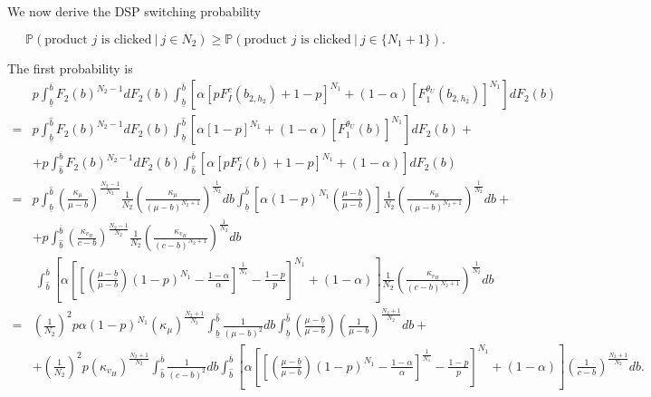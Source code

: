 We now derive the DSP switching probability

\begin{equation*}
     \mathbb{P}(\text{product } j \text{ is clicked} \ | \ j \in N_2 ) \geq \mathbb{P}(\text{product } j \text{ is clicked} \ | \ j \in \{N_{1}+1\} ).
\end{equation*}

\noindent The first probability is
{\footnotesize
\begin{align*}
    & p \int_{\underline{b}}^{\overline{b}}F_2(b)^{N_2-1} dF_2(b) \int_{\underline{b}}^{\overline{b}}  \left[\alpha \left[pF_I^c(b_{2,h_2}) + 1-p \right]^{N_1} + (1-\alpha) \left[F_1^{\theta_U}(b_{2,h_2})\right]^{N_1}\right]  dF_2(b) \\[5pt]
    = & p \int_{\underline{b}}^{\hat{b}}F_2(b)^{N_2-1} dF_2(b) \int_{\underline{b}}^{\hat{b}} \left[\alpha \left[1-p \right]^{N_1} + (1-\alpha) \left[F_1^{\theta_U}(b)\right]^{N_1}\right]  dF_2(b) + \\[5pt]
    & + p \int_{\hat{b}}^{\overline{b}}F_2(b)^{N_2-1} dF_2(b) \int_{\hat{b}}^{\overline{b}} \left[\alpha \left[pF_I^c(b) + 1-p \right]^{N_1} + (1-\alpha) \right]  dF_2(b) \\[5pt]
    = & p \int_{\underline{b}}^{\hat{b}}\left(\frac{\kappa_{\mu}}{\mu-b}\right)^{\frac{N_2-1}{N_2}} \frac{1}{N_2}\left(\frac{\kappa_{\mu}}{(\mu-b)^{N_2+1}}\right)^{\frac{1}{N_2}} db  \int_{\underline{b}}^{\hat{b}} \left[\alpha (1-p)^{N_1}  \left( \frac{\mu-\underline{b}}{\mu - b}\right)\right] \frac{1}{N_2}\left(\frac{\kappa_{\mu}}{(\mu-b)^{N_2+1}}\right)^{\frac{1}{N_2}}  db + \\[5pt]
    & + p \int_{\hat{b}}^{\overline{b}}\left(\frac{\kappa_{v_H}}{c-b}\right)^{\frac{N_2-1}{N_2}} \frac{1}{N_2}\left(\frac{\kappa_{v_H}}{(c-b)^{N_2+1}}\right)^{\frac{1}{N_2}} db \\[5pt]
    & \ \int_{\hat{b}}^{\overline{b}} \left[ \alpha \left[\left[ \left( \frac{\mu-\underline{b}}{\mu - b}\right) (1-p)^{N_1} - \frac{1-\alpha}{\alpha}\right]^{\frac{1}{N_1}} - \frac{1-p}{p} \right]^{N_1} + (1-\alpha) \right] \frac{1}{N_2}\left(\frac{\kappa_{v_H}}{(c-b)^{N_2+1}}\right)^{\frac{1}{N_2}}  db \\[5pt]
    = & \left(\frac{1}{N_2}\right)^2 p\alpha (1-p)^{N_1} (\kappa_{\mu})^{\frac{N_2+1}{N_2}} \int_{\underline{b}}^{\hat{b}}\frac{1}{(\mu-b)^2}db  \int_{\underline{b}}^{\hat{b}}   \left( \frac{\mu-\underline{b}}{\mu - b}\right) \left(\frac{1}{\mu-b}\right)^{\frac{N_2+1}{N_2}}  db + \\[5pt]
    & + \left(\frac{1}{N_2}\right)^2p (\kappa_{v_H})^{\frac{N_2+1}{N_2}} \int_{\hat{b}}^{\overline{b}}\frac{1}{(c-b)^2} db \int_{\hat{b}}^{\overline{b}} \left[ \alpha \left[\left[ \left( \frac{\mu-\underline{b}}{\mu - b}\right) (1-p)^{N_1} - \frac{1-\alpha}{\alpha}\right]^{\frac{1}{N_1}} - \frac{1-p}{p} \right]^{N_1} + (1-\alpha) \right] \left(\frac{1}{c-b}\right)^{\frac{N_2+1}{N_2}} db.
\end{align*}
}
